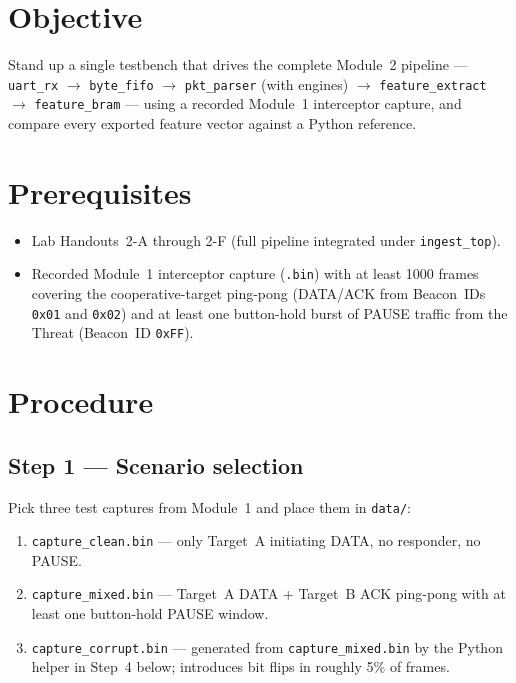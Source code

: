 \documentclass[11pt,letterpaper]{article}
\begin{document}

\section{Objective}
Stand up a single testbench that drives the complete Module~2 pipeline --- \texttt{uart\_rx} $\to$ \texttt{byte\_fifo} $\to$ \texttt{pkt\_parser} (with \CRC{} engines) $\to$ \texttt{feature\_extract} $\to$ \texttt{feature\_bram} --- using a recorded Module~1 interceptor capture, and compare every exported feature vector against a Python reference.

\section{Prerequisites}
\begin{itemize}[leftmargin=2em]
	\item Lab Handouts~2-A through 2-F (full pipeline integrated under \texttt{ingest\_top}).
	\item Recorded Module~1 interceptor capture (\texttt{.bin}) with at least 1000 frames covering the cooperative-target ping-pong (DATA/ACK from Beacon~IDs \texttt{0x01} and \texttt{0x02}) and at least one button-hold burst of PAUSE traffic from the Threat (Beacon~ID \texttt{0xFF}).
\end{itemize}

\section{Procedure}

\subsection{Step 1 --- Scenario selection}
Pick three test captures from Module~1 and place them in \texttt{data/}:
\begin{enumerate}[leftmargin=2em]
	\item \texttt{capture\_clean.bin} --- only Target~A initiating DATA, no responder, no PAUSE.
	\item \texttt{capture\_mixed.bin} --- Target~A DATA + Target~B ACK ping-pong with at least one button-hold PAUSE window.
	\item \texttt{capture\_corrupt.bin} --- generated from \texttt{capture\_mixed.bin} by the Python helper in Step~4 below; introduces bit flips in roughly 5\% of frames.
\end{enumerate}
\end{document}

